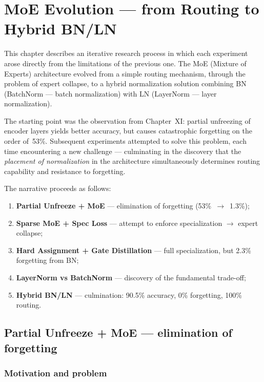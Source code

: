 \documentclass[11pt,a4paper]{report}
\begin{document}
\chapter{MoE Evolution --- from Routing to Hybrid BN/LN}
\label{ch:moe_evolution}

This chapter describes an iterative research process in which each experiment arose directly from the limitations of the previous one. The MoE (Mixture of Experts) architecture evolved from a simple routing mechanism, through the problem of expert collapse, to a hybrid normalization solution combining BN (BatchNorm --- batch normalization) with LN (LayerNorm --- layer normalization).

The starting point was the observation from Chapter~XI: partial unfreezing of encoder layers yields better accuracy, but causes catastrophic forgetting on the order of~53\%. Subsequent experiments attempted to solve this problem, each time encountering a new challenge --- culminating in the discovery that the \emph{placement of normalization} in the architecture simultaneously determines routing capability and resistance to forgetting.

The narrative proceeds as follows:
\begin{enumerate}
    \item \textbf{Partial Unfreeze + MoE} --- elimination of forgetting (53\%~$\to$~1.3\%);
    \item \textbf{Sparse MoE + Spec Loss} --- attempt to enforce specialization $\to$ expert collapse;
    \item \textbf{Hard Assignment + Gate Distillation} --- full specialization, but 2.3\% forgetting from BN;
    \item \textbf{LayerNorm vs BatchNorm} --- discovery of the fundamental trade-off;
    \item \textbf{Hybrid BN/LN} --- culmination: 90.5\% accuracy, 0\% forgetting, 100\% routing.
\end{enumerate}


\section{Partial Unfreeze + MoE --- elimination of forgetting}
\label{sec:partial_moe}

\subsection{Motivation and problem}
\end{document}
